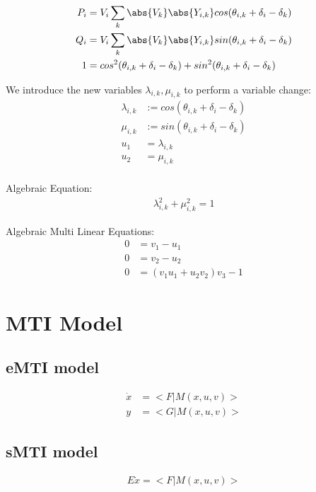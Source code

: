 \documentclass{article}
\begin{document}
\begin{align}
    P_i &= V_i \sum_k \abs{V_k} \abs{Y_{i,k}} cos(\theta_{i,k} +\delta_i -\delta_k) \\
    Q_i &= V_i \sum_k \abs{V_k} \abs{Y_{i,k}} sin(\theta_{i,k} +\delta_i -\delta_k) \\
    1 &= cos^2(\theta_{i,k} +\delta_i -\delta_k) + sin^2(\theta_{i,k} +\delta_i -\delta_k) 
\end{align}

We introduce the new variables $\lambda_{i,k}, \mu_{i,k}$ to perform a variable change:
\begin{align}
    \lambda_{i,k} &:= cos(\theta_{i,k} +\delta_i -\delta_k)\\
    \mu_{i,k} &:= sin(\theta_{i,k} +\delta_i -\delta_k)\\
    u_1 &= \lambda_{i,k} \\
    u_2 &= \mu_{i,k} \\
\end{align}

Algebraic Equation:
\begin{align}
    \lambda_{i,k}^2 + \mu_{i,k}^2 = 1
\end{align}

Algebraic Multi Linear Equations:
\begin{align}
    0 &= v_1 - u_1 \\
    0 &= v_2 - u_2 \\
    0 &= (v_1 u_1 + u_2 v_2)v_3-1
\end{align}

\section{MTI Model}

\subsection{eMTI model}
\begin{align}
    \dot{x} &= <F|M(x,u,v)> \\
    y &= <G|M(x,u,v)>
\end{align}

\subsection{sMTI model}

\begin{align}
    E \dot{x} = <F|M(x,u,v)>
\end{align}
\end{document}
